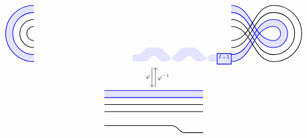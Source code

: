 \begin{figure}[ht]
\[\begin{tikzcd}[row sep=2pc]
\begin{tikzpicture}[baseline=-.5ex, scale=0.6]
\begin{scope}[xshift=7cm]
\draw[thick, blue, fill=blue!10] (-1, -2.175) rectangle ++(1, 0.75) node[pos=.5] {$\scriptstyle \ell-1$};
\fill[blue, opacity=0.1] (-7, -2) [rounded corners]-- ++(0.5, 0) -- ++(0.5, 0) -- ++(0.5, 0.5) -- ++(0.5, -0.5) -- ++(0.5, 0) [sharp corners]-- ++(0.25, 0.25) 
[rounded corners]-- ++(-0.75, 0.75) -- ++(-1, 0) -- ++(-0.5, -0.5) -- ++(-0.5, 0);
\fill[blue, opacity=0.1] (-4.25, -1.75) [rounded corners]-- ++(0.75, 0.75) -- ++(1, 0) [sharp corners]-- ++(0.75, -0.75)
[rounded corners]-- ++(-0.25, -0.25) -- ++(-0.5, 0) -- ++(-0.5, 0.5) -- ++(-0.5, -0.5) -- ++(-0.5, 0) -- ++(-0.25, 0.25);
\fill[blue, opacity=0.1] (-1, -1.5) -- ++(-0.5, 0) -- ++(-0.25, -0.25) -- ++(0.25, -0.25) -- ++(0.5, 0);
\end{scope}
\draw[thick] (-7, 0.5) arc (90:270:0.5) (-7, 1) arc (90:270:1);
\draw[thick, blue] (-7, 1.5) arc (90:270:1.5) (-7, 2) arc (90:270:2);
\fill[blue, opacity=0.1] (-7, 1.5) arc (90:270:1.5) -- (-7, -2) arc (-90:-270:2);
\begin{scope}
\draw[thick] (7, 1) to[out=0, in=180] ++(3, -2.5) (7, 0.5) to[out=0, in=180] ++(3, -2.5);
\draw[thick, blue] (7, 2) to[out=0, in=180] ++(3, -2.5) (7, 1.5) to[out=0, in=180] ++(3, -2.5);
\fill[blue, opacity=0.1] (7, 2) to[out=0, in=180] ++(3, -2.5) -- (10, -1) to[out=180, in=0] ++(-3, 2.5);
\end{scope}
\begin{scope}[yscale=-1]
\draw[thick] (7, 1) to[out=0, in=180] ++(3, -2.5) (7, 0.5) to[out=0, in=180] ++(3, -2.5);
\draw[thick, blue] (7, 2) to[out=0, in=180] ++(3, -2.5) (7, 1.5) to[out=0, in=180] ++(3, -2.5);
\fill[blue, opacity=0.1] (7, 2) to[out=0, in=180] ++(3, -2.5) -- (10, -1) to[out=180, in=0] ++(-3, 2.5);
\end{scope}
\draw[thick] (10, 2) arc (90:-90:2) (10, 1.5) arc (90:-90:1.5);
\draw[thick, blue] (10, 1) arc (90:-90:1) (10, 0.5) arc (90:-90:0.5);
\fill[blue, opacity=0.1] (10, 1) arc (90:-90:1) -- ++(0, 0.5) arc (-90:90:0.5);
\end{tikzpicture}
\arrow[d,"\varphi"', xshift=-.5ex]
\arrow[from=d,"\varphi^{-1}"', xshift=.5ex]\\
\begin{tikzpicture}[baseline=-.5ex, scale=0.6]
\begin{scope}
\draw[thick] (-7, 0.5) -- ++(7,0) (-7, 1) -- ++(7,0);
\draw[thick, blue] (-7, 1.5) -- ++(7,0) (-7, 2) -- ++(7,0);
\fill[blue, opacity=0.1] (-7, 1.5) -- ++(7,0) -- ++(0, 0.5) -- ++(-7, 0);
%
\draw[thick, rounded corners] (-7, -0.5) -- ++(0.5, 0) -- ++(4.5, 0) -- ++(0.5, -0.5) -- ++(1,0) -- ++(0.5, 0);

\end{scope}
\end{tikzpicture}
\end{tikzcd}\]
\end{figure}
